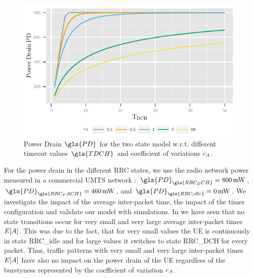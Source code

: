 \begin{figure}
	\centering
	\includegraphics{network/performance_model/numerical_examples/figures/2state_tdch_pd}
	\caption{Power Drain \(\gls{PD}\) for the two state model w.r.t. different timeout values \(\gls{TDCH}\) and coefficient of variations \(c_{A}\).}
	\label{fig:network:performance_model:numerical_examples:validations:analytic_vs_simulation:2state_tdch_pd}
\end{figure}

For the power drain in the different \gls{RRC} states, we use the radio network power measured in a commercial UMTS network \cite{Qian2010a}: \(\gls{PD}_{\gls{RRC_DCH}} = \SI{800}{\milli\watt}\), \(\gls{PD}_{\gls{RRC_FACH}} = \SI{460}{\milli\watt}\), and \(\gls{PD}_{\gls{RRC_idle}} = \SI{0}{\milli\watt}\).
We investigate the impact of the average inter-packet time, the impact of the timer configuration and validate our model with simulations. 
In  we have seen that no state transitions occur for very small and very large average inter-packet times \(E[A]\).
This was due to the fact, that for very small values the \gls{UE} is continuously in state \gls{RRC_idle} and for large values it switches to state \gls{RRC_DCH} for every packet.
Thus, traffic patterns with very small and very large inter-packet times \(E[A]\) have also no impact on the power drain of the \gls{UE} regardless of the burstyness represented by the coefficient of variation \(c_{A}\).


